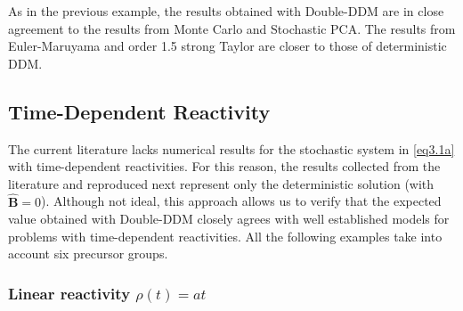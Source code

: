 \documentclass[preprint,12pt,authoryear]{elsarticle}
\begin{document}
As in the previous example, the results obtained with Double-DDM are in close agreement to the results from Monte Carlo and Stochastic PCA. The results from Euler-Maruyama and order 1.5 strong Taylor are closer to those of deterministic DDM.

\subsection{Time-Dependent Reactivity}\label{sec52}

The current literature lacks numerical results for the stochastic system in \cref{eq3.1a} with time-dependent reactivities.
For this reason, the results collected from the literature and reproduced next represent only the deterministic solution (with $\bm{\hat{B}}=0$). 
Although not ideal, this approach allows us to verify that the expected value obtained with Double-DDM closely agrees with well established models for problems with time-dependent reactivities.
All the following examples take into account six precursor groups.

\subsubsection{Linear reactivity $\rho(t)=at$}\label{sec521}
\end{document}
